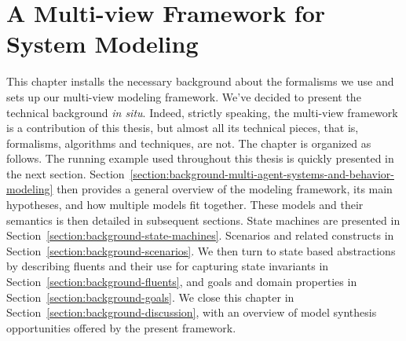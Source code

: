\chapter{A Multi-view Framework for System Modeling\label{chapter:framework}}

This chapter installs the necessary background about the formalisms we use and sets up our multi-view modeling framework. We've decided to present the technical background \emph{in situ}. Indeed, strictly speaking, the multi-view framework is a contribution of this thesis, but almost all its technical pieces, that is, formalisms, algorithms and techniques, are not. The chapter is organized as follows. The running example used throughout this thesis is quickly presented in the next section. Section~\ref{section:background-multi-agent-systems-and-behavior-modeling} then provides a general overview of the modeling framework, its main hypotheses, and how multiple models fit together. These models and their semantics is then detailed in subsequent sections. State machines are presented in Section~\ref{section:background-state-machines}. Scenarios and related constructs in Section~\ref{section:background-scenarios}. We then turn to state based abstractions by describing fluents and their use for capturing state invariants in Section~\ref{section:background-fluents}, and goals and domain properties in Section~\ref{section:background-goals}. We close this chapter in Section~\ref{section:background-discussion}, with an overview of model synthesis opportunities offered by the present framework.









